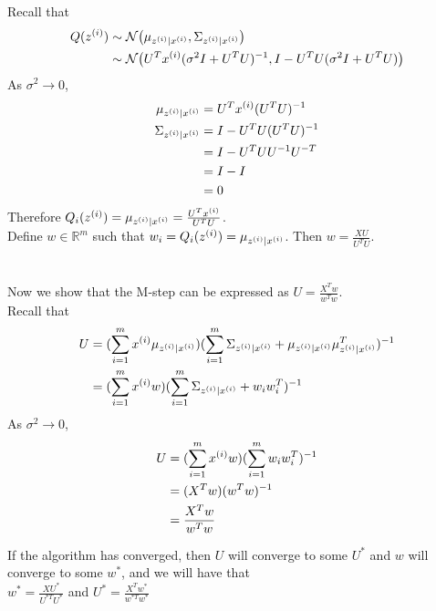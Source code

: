 \documentclass[11pt]{article}
\begin{document}
Recall that 
\begin{align*}
    Q(z^{(i)}) &\sim \mathcal{N}\big(\mu_{z^{(i)}|x^{(i)}}, \Sigma_{z^{(i)}|x^{(i)}} \big) \\
             &\sim \mathcal{N}\big(U^T x^{(i)} (\sigma^2 I + U^T U)^{-1}, I - U^T U (\sigma^2 I + U^T U) \big) \\
\end{align*}
As $\sigma^2 \to 0$,
\begin{align*}
    \mu_{z^{(i)}|x^{(i)}}    &= U^T x^{(i)} (U^T U)^{-1} \\
    \Sigma_{z^{(i)}|x^{(i)}} &= I - U^T U (U^T U)^{-1} \\
                         &= I - U^T U U^{-1} U^{-T} \\
                         &= I - I \\
                         &= 0 \\
\end{align*}
Therefore $Q_i(z^{(i)}) = \mu_{z^{(i)}|x^{(i)}} = \frac{U^T x^{(i)}}{U^T U}$. \\
Define $w \in \mathbb{R}^m$ such that $w_i = Q_i(z^{(i)}) = \mu_{z^{(i)}|x^{(i)}}$. Then $w = \frac{XU}{U^T U}$. \\
\\\\
Now we show that the M-step can be expressed as $U = \frac{X^T w}{w^T w}$. \\
Recall that 
\begin{align*}
    U &= (\sum_{i=1}^m x^{(i)} \mu_{z^{(i)}|x^{(i)}})(\sum_{i=1}^m \Sigma_{z^{(i)}|x^{(i)}} + \mu_{z^{(i)}|x^{(i)}} \mu_{z^{(i)}|x^{(i)}}^T)^{-1} \\
      &= (\sum_{i=1}^m x^{(i)} w)(\sum_{i=1}^m \Sigma_{z^{(i)}|x^{(i)}} + w_i w_i^T)^{-1} \\
\end{align*}
As $\sigma^2 \to 0$,
\begin{align*}
    U &= (\sum_{i=1}^m x^{(i)} w)(\sum_{i=1}^m w_i w_i^T)^{-1} \\
      &= (X^T w)(w^T w)^{-1} \\
      &= \frac{X^T w}{w^T w} \\
\end{align*}

If the algorithm has converged, then $U$ will converge to some $U^*$ and $w$ will converge to some $w^*$, and we will have that \\
$w^* = \frac{XU^*}{U^{*T}U^*}$ and $U^* = \frac{X^T w^*}{w^{*T} w^*}$\\
\end{document}
